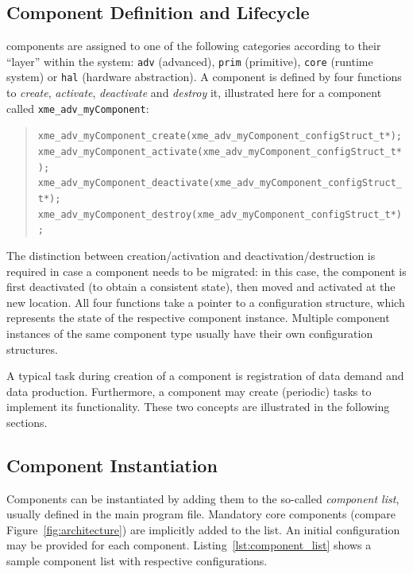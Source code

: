 \subsection{Component Definition and Lifecycle}
\label{sec:component_definition}

\xme components are assigned to one of the following categories according to their ``layer'' within the system:
\verb|adv| (advanced), \verb|prim| (primitive), \verb|core| (runtime system) or \verb|hal| (hardware abstraction).
A \xme component is defined by four functions to \emph{create}, \emph{activate}, \emph{deactivate} and \emph{destroy} it,
illustrated here for a component called \verb|xme_adv_myComponent|:
\begin{quote}
	\verb|xme_adv_myComponent_create(xme_adv_myComponent_configStruct_t*);|\\
	\verb|xme_adv_myComponent_activate(xme_adv_myComponent_configStruct_t*);|\\
	\verb|xme_adv_myComponent_deactivate(xme_adv_myComponent_configStruct_t*);|\\
	\verb|xme_adv_myComponent_destroy(xme_adv_myComponent_configStruct_t*);|
\end{quote}
%
The distinction between creation/activation and deactivation/destruction is required in case a component needs to be migrated:
in this case, the component is first deactivated (to obtain a consistent state), then moved and activated at the new location.
All four functions take a pointer to a configuration structure, which represents the state of the respective component instance.
Multiple component instances of the same component type usually have their own configuration structures.

A typical task during creation of a component is registration of data demand and data production.
Furthermore, a component may create (periodic) tasks to implement its functionality.
These two concepts are illustrated in the following sections.

\subsection{Component Instantiation}

Components can be instantiated by adding them to the so-called \emph{component list}, usually defined in the main program file.
Mandatory core components (compare Figure~\ref{fig:architecture}) are implicitly added to the list.
An initial configuration may be provided for each component.
Listing~\ref{lst:component_list} shows a sample component list with respective configurations.

